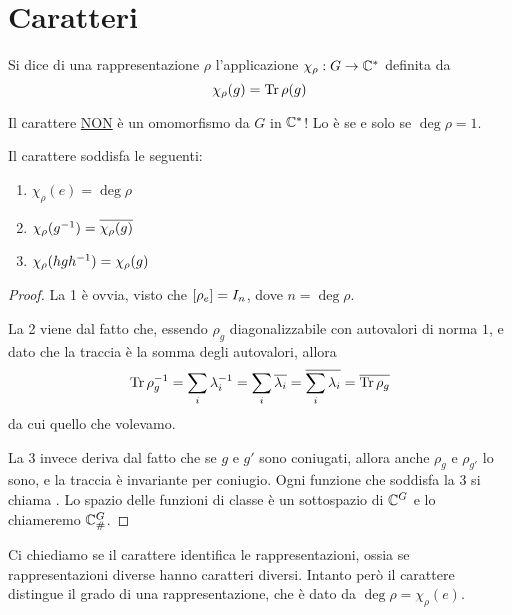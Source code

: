 \section{Caratteri}

\begin{mydef}
  Si dice  di una rappresentazione $\rho$ l'applicazione $\chi_\rho: G \rightarrow \mathbb C^*$ definita da 
  \[
  \chi_\rho(g)=\operatorname{Tr} \rho(g)
  \]
\end{mydef}

\begin{Achtung}
  Il carattere \underline{NON} è un omomorfismo da $G$ in $\mathbb C^*$! Lo è se e solo se $\deg \rho = 1$. 
\end{Achtung}

\begin{myprop}
  Il carattere soddisfa le seguenti:
  \begin{enumerate}
    \item $\chi_\rho(e)=\deg\rho$
    \item $\chi_\rho(g^{-1})=\overline{\chi_\rho(g)}$
    \item $\chi_\rho(hgh^{-1})=\chi_\rho(g)$
  \end{enumerate}
\end{myprop}

\begin{proof}
  La 1 è ovvia, visto che $[\rho_e]= I_n$, dove $n=\deg \rho$.
  
  La 2 viene dal fatto che, essendo $\rho_g$ diagonalizzabile con autovalori di norma $1$, e dato che la traccia è la somma degli autovalori, allora
  \[
		\operatorname{Tr}\rho_g^{-1} = \sum_i \lambda_i^{-1} = \sum_i \overline{\lambda_i} = \overline{\sum_i \lambda_i} = \overline{\operatorname{Tr}\rho_g} 
  \]
  da cui quello che volevamo.
  
La 3 invece deriva dal fatto che se $g$ e $g'$ sono coniugati, allora anche $\rho_g$ e $\rho_{g'}$ lo sono, e la traccia è invariante per coniugio. Ogni funzione che soddisfa la 3 si chiama . Lo spazio delle funzioni di classe è un sottospazio di $\mathbb C^{G}$ e lo chiameremo $\mathbb C^{G}_\#$.
\end{proof}

Ci chiediamo se il carattere identifica le rappresentazioni, ossia se rappresentazioni diverse hanno caratteri diversi.
Intanto però il carattere distingue il grado di una rappresentazione, che è dato da $\deg \rho = \chi_\rho(e)$.

